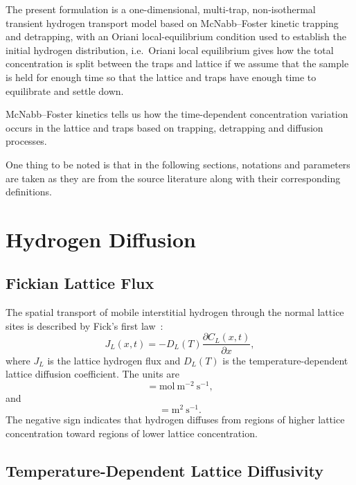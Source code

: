 \documentclass[a4paper,12pt,oneside]{report}
\begin{document}
The present formulation is a one-dimensional, multi-trap, non-isothermal transient hydrogen transport model based on McNabb--Foster kinetic trapping and detrapping, with an Oriani local-equilibrium condition used to establish the initial hydrogen distribution, i.e.\ Oriani local equilibrium gives how the total concentration is split between the traps and lattice if we assume that the sample is held for enough time so that the lattice and traps have enough time to equilibrate and settle down.

McNabb--Foster kinetics tells us how the time-dependent concentration variation occurs in the lattice and traps based on trapping, detrapping and diffusion processes.

One thing to be noted is that in the following sections, notations and parameters are taken as they are from the source literature along with their corresponding definitions.

\section{Hydrogen Diffusion}

\subsection{Fickian Lattice Flux}

The spatial transport of mobile interstitial hydrogen through the normal lattice sites is described by Fick's first law~\cite{Fallahmohammadi2013,Legrand2015,MartinezPaneda2020}:
\begin{equation}
J_L(x, t) = -D_L(T) \frac{\partial C_L(x, t)}{\partial x},
\label{eq:ch3_JL}
\end{equation}
where $J_L$ is the lattice hydrogen flux and $D_L(T)$ is the temperature-dependent lattice diffusion coefficient.
The units are
\begin{equation}
[J_L] = \mathrm{mol~m^{-2}~s^{-1}},
\label{eq:ch3_JL_units}
\end{equation}
and
\begin{equation}
[D_L] = \mathrm{m^2~s^{-1}}.
\label{eq:ch3_DL_units}
\end{equation}
The negative sign indicates that hydrogen diffuses from regions of higher lattice concentration toward regions of lower lattice concentration.

\subsection{Temperature-Dependent Lattice Diffusivity}
\end{document}
